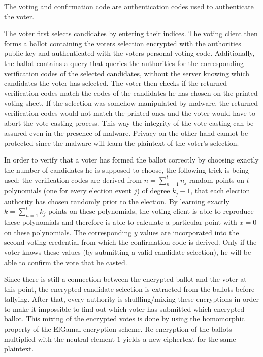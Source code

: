 The voting and confirmation code are authentication codes used to authenticate the voter.

The voter first selects candidates by entering their indices. The voting client then forms a ballot containing the voters selection encrypted with the authorities public key and authenticated with the voters personal voting code. Additionally, the ballot contains a query that queries the authorities for the corresponding verification codes of the selected candidates, without the server knowing which candidates the voter has selected. The voter then checks if the returned verification codes match the codes of the candidates he has chosen on the printed voting sheet. If the selection was somehow manipulated by malware, the returned verification codes would not match the printed ones and the voter would have to abort the vote casting process. This way the integrity of the vote casting can be assured even in the presence of malware. Privacy on the other hand cannot be protected since the malware will learn the plaintext of the voter's selection.

In order to verify that a voter has formed the ballot correctly by choosing exactly the number of candidates he is supposed to choose, the following trick is being used: the verification codes are derived from $n = \sum_{n=1}^{t} n_j$ random points on $t$ polynomials (one for every election event $j$) of degree $k_j - 1$, that each election authority has chosen randomly prior to the election. By learning exactly $k = \sum_{n=1}^{t} k_j$ points on these polynomials, the voting client is able to reproduce these polynomials and therefore is able to calculate a particular point with $x=0$ on these polynomials. The corresponding $y$ values are incorporated into the second voting credential from which the confirmation code is derived. Only if the voter knows these values (by submitting a valid candidate selection), he will be able to confirm the vote that he casted.

Since there is still a connection between the encrypted ballot and the voter at this point, the encrypted candidate selection is extracted from the ballots before tallying. After that, every authority is shuffling/mixing these encryptions in order to make it impossible to find out which voter has submitted which encrypted ballot. This mixing of the encrypted votes is done by using the homomorphic property of the ElGamal encryption scheme. Re-encryption of the ballots multiplied with the neutral element $1$ yields a new ciphertext for the same plaintext.

